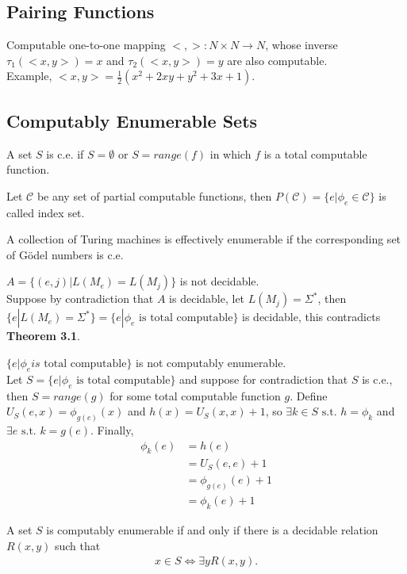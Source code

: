 \subsection{Pairing Functions}
 Computable one-to-one mapping $<,>:N \times N \rightarrow
N$, whose inverse $\tau_1(<x,y>)=x$ and $\tau_2(<x,y>)=y$ are also computable.\\
Example, $<x,y>=\frac{1}{2}(x^2+2xy+y^2+3x+1)$.


\subsection{Computably Enumerable Sets}
 A set $S$ is c.e. if $S=\emptyset$ or
$S=range(f)$ in which $f$ is a total computable function.

 Let $\mathscr{C}$ be any set of partial computable functions,
then $P(\mathscr{C})=\{e|\phi_e \in \mathscr{C}\}$ is called index set.

 A collection of Turing machines is effectively
enumerable if the corresponding set of G\"odel numbers is c.e.

 $A=\{(e,j)|L(M_e) = L(M_j)\}$ is not decidable.\\
Suppose by contradiction that $A$ is decidable, let $L(M_j)=\Sigma^*$, then
$\{e|L(M_e)=\Sigma^*\}=\{e|\phi_e \text{ is total computable}\}$ is decidable,
this contradicts \textbf{Theorem 3.1}.

 $\{e | \phi_e is \text{ total computable}\}$ is not
computably enumerable.\\
Let $S=\{e|\phi_e \text{ is total computable}\}$ and suppose for contradiction
that $S$ is c.e., then $S=range(g)$ for some total computable function $g$.
Define $U_S(e,x)=\phi_{g(e)}(x)$ and $h(x)=U_S(x,x)+1$, so $\exists k \in S
\text{ s.t. } h=\phi_k$ and $\exists e \text{ s.t. } k=g(e)$.
Finally,
\begin{align*}
  \phi_k(e)&=h(e)\\
  &=U_S(e,e)+1 \\
  &=\phi_{g(e)}(e)+1\\
  &=\phi_k(e)+1
\end{align*}

 A set $S$ is computably enumerable if and only if there is a
decidable
relation $R(x, y)$ such that
\begin{align*}
x \in S \Leftrightarrow \exists y R(x, y).
\end{align*}

